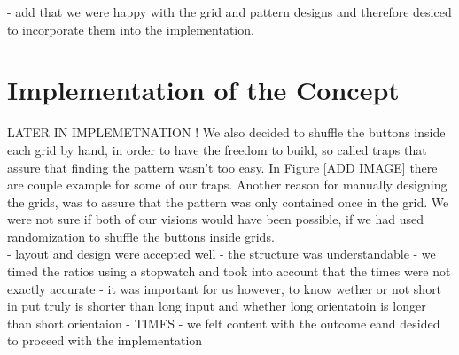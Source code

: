 - add that we were happy with the grid and pattern designs and therefore desiced to incorporate them into the implementation.






\section{Implementation of the Concept}

LATER IN IMPLEMETNATION ! 
We also decided to shuffle the buttons inside each grid by hand, in order to have the freedom to build, so called traps that assure that finding the pattern wasn't too easy. In Figure [ADD IMAGE] there are couple example for some of our traps. Another reason for manually designing the grids, was to assure that the pattern was only contained once in the grid. We were not sure if both of our visions would have been possible, if we had used randomization to shuffle the buttons inside grids. \\





- layout and design were accepted well 
- the structure was  understandable 
- we timed the ratios using a stopwatch and took into account that the times were not exactly accurate
- it was important for us however, to know wether or not short in put truly is shorter than long input and whether long orientatoin is longer than short orientaion
- TIMES
- we felt content with the outcome eand desided to proceed with the implementation 


